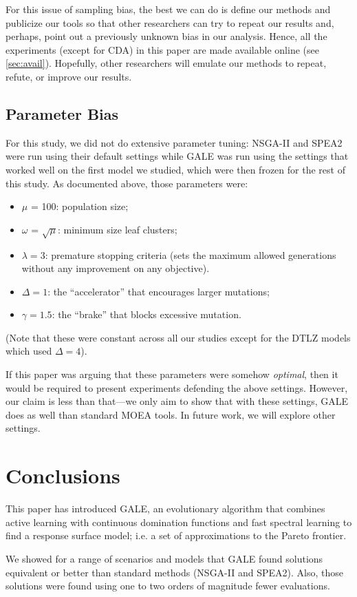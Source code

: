 \documentclass[10pt,journal,compsoc]{IEEEtran}
\newcommand{\bi}{\begin{itemize}}
\newcommand{\ei}{\end{itemize}}
\newcommand{\tion}[1]{\textsection\ref{sec:#1}}
\begin{document}
For this issue of sampling bias, the best we can do
is define our methods and publicize our tools so
that other researchers can try to repeat our results
and, perhaps, point out a previously unknown bias in
our analysis. Hence, all the experiments (except for
CDA) in this paper are made available online (see \tion{avail}).  Hopefully, other
researchers will emulate our methods to repeat,
refute, or improve our results.


\subsection{Parameter Bias}
For this study, we did not do extensive parameter tuning:
NSGA-II and SPEA2 were run using their default settings
while GALE was run using the settings that worked well on the first model we
studied, which were then frozen for the
rest of this study. As documented above, those parameters were:
\bi
\item $\mu$ = 100:  population size;
\item $\omega$ = $\sqrt{\mu}$: minimum size leaf clusters;
\item $\lambda = 3$: premature stopping criteria (sets the
maximum allowed 
generations without
any improvement on any objective).
\item   $\Delta=1$: the ``accelerator'' that encourages larger mutations;
\item  $\gamma=1.5$: the ``brake'' that blocks excessive mutation.
\ei
(Note that these were constant across all our studies except for the DTLZ models which used
$\Delta=4$).

If this paper was arguing that these parameters were somehow {\em optimal},
then it would be required to present experiments defending the above settings.
However, our  claim is less than that---we only aim  to show
that with these settings, GALE does as well than standard
MOEA tools. In future work, we will explore other  settings.



   
\section{Conclusions}
This paper has introduced GALE, an evolutionary
algorithm that combines active learning with
continuous domination functions and fast spectral
learning to find a response surface model; i.e. a
set of approximations to the Pareto frontier.


We showed for a range of scenarios and models
that GALE found solutions equivalent or better than
standard methods (NSGA-II and SPEA2).  Also, those
solutions were found using one to two orders of
magnitude fewer evaluations.
\end{document}
